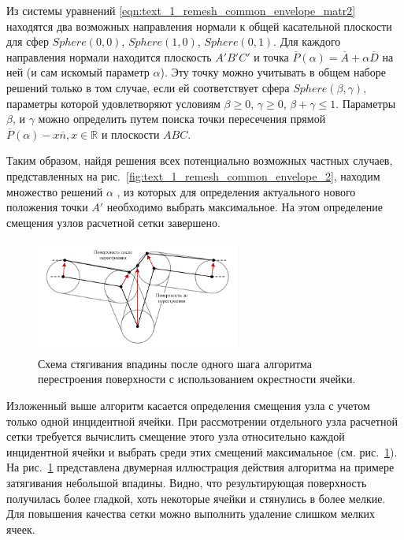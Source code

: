 Из системы уравнений \eqref{eqn:text_1_remesh_common_envelope_matr2} находятся два возможных направления нормали к общей касательной плоскости для сфер $Sphere(0,0)$, $Sphere(1,0)$, $Sphere(0,1)$.
Для каждого направления нормали находится плоскость $A'B'C'$ и точка $\overline{P}(\alpha) = \overline{A} + \alpha \overline{D}$ на ней (и сам искомый параметр $\alpha$).
Эту точку можно учитывать в общем наборе решений только в том случае, если ей соответствует сфера $Sphere(\beta, \gamma)$, параметры которой удовлетворяют условиям $\beta \ge 0$, $\gamma \ge 0$, $\beta + \gamma \le 1$.
Параметры $\beta$, и $\gamma$ можно определить путем поиска точки пересечения прямой $\overline{P}(\alpha) - x \overline{n}, x \in \mathbb{R}$ и плоскости $ABC$.

Таким образом, найдя решения всех потенциально возможных частных случаев, представленных на рис.~\ref{fig:text_1_remesh_common_envelope_2}, находим множество решений $\alpha$ , из которых для определения актуального нового положения точки $A'$ необходимо выбрать максимальное.
На этом определение смещения узлов расчетной сетки завершено.

\begin{figure}[h]
\centering
\includegraphics[width=0.6\textwidth]{./pics/text_1_remesh_common_envelope/out_from_cave.pdf}
\singlespacing
{}\caption{Схема стягивания впадины после одного шага алгоритма перестроения поверхности с использованием окрестности ячейки.}
\label{fig:text_1_remesh_common_envelope_4}
\end{figure}

Изложенный выше алгоритм касается определения смещения узла с учетом только одной инцидентной ячейки.
При рассмотрении отдельного узла расчетной сетки требуется вычислить смещение этого узла относительно каждой инцидентной ячейки и выбрать среди этих смещений максимальное (см. рис.~\ref{fig:text_1_remesh_common_envelope_4}).
На рис.~\ref{fig:text_1_remesh_common_envelope_4} представлена двумерная иллюстрация действия алгоритма на примере затягивания небольшой впадины.
Видно, что результирующая поверхность получилась более гладкой, хоть некоторые ячейки и стянулись в более мелкие.
Для повышения качества сетки можно выполнить удаление слишком мелких ячеек.

